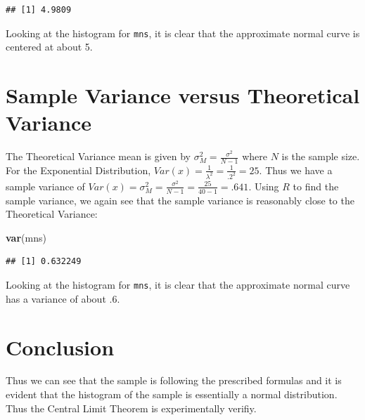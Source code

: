\documentclass[]{article}
\newenvironment{Shaded}{\begin{snugshade}}{\end{snugshade}}
\newcommand{\KeywordTok}[1]{\textcolor[rgb]{0.13,0.29,0.53}{\textbf{{#1}}}}
\newcommand{\NormalTok}[1]{{#1}}
\begin{document}
\begin{verbatim}
## [1] 4.9809
\end{verbatim}

Looking at the histogram for \texttt{mns}, it is clear that the
approximate normal curve is centered at about 5.

\section{Sample Variance versus Theoretical Variance}

The Theoretical Variance mean is given by
\(\sigma_M^2 = \frac{\sigma^2}{N-1}\) where \(N\) is the sample size.
For the Exponential Distribution,
\(Var(x) = \frac{1}{\lambda^2} = \frac{1}{.2^2} = 25\). Thus we have a
sample variance of
\(Var(x) = \sigma_M^2 = \frac{\sigma^2}{N-1} = \frac{25}{40 - 1} = .641\).
Using \(R\) to find the sample variance, we again see that the sample
variance is reasonably close to the Theoretical Variance:

\begin{Shaded}
\begin{Highlighting}[]
\KeywordTok{var}\NormalTok{(mns)}
\end{Highlighting}
\end{Shaded}

\begin{verbatim}
## [1] 0.632249
\end{verbatim}

Looking at the histogram for \texttt{mns}, it is clear that the
approximate normal curve has a variance of about .6.
\section{Conclusion} Thus we can see that the sample is following the
prescribed formulas and it is evident that the histogram of the sample
is essentially a normal distribution. Thus the Central Limit Theorem is
experimentally verifiy.
\end{document}
